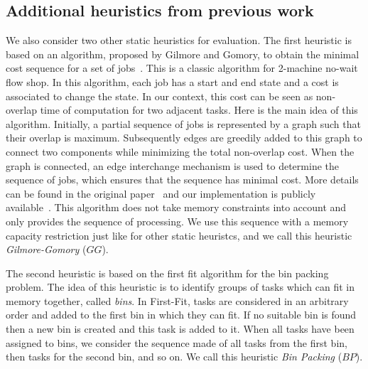 \documentclass[sigconf]{acmart}
\begin{document}
{		\subsection{Additional heuristics from previous work}
		
		
		We also consider two other static heuristics for evaluation. The first heuristic is based on an algorithm, proposed by Gilmore and Gomory, to obtain the minimal cost sequence for a set of jobs~\cite{Gilmore-Gomory:1964}. This is a classic algorithm for 2-machine no-wait flow shop. In this algorithm, each job has a start and end state and a cost is associated to change the state. In our context, this cost can be seen as non-overlap time of computation for two adjacent tasks. Here is the main idea of this algorithm. Initially, a partial sequence of jobs is represented by a graph such that their overlap is maximum. Subsequently edges are greedily added to this graph to connect two components while minimizing the total non-overlap cost. When the graph is  connected, an edge interchange mechanism is used to determine the sequence of jobs, which ensures that the sequence has minimal cost. More details can be found in the original paper~\cite{Gilmore-Gomory:1964} and our implementation is publicly available~\cite{gitworkrepo}. This algorithm does not take memory constraints into account and only provides the sequence of processing. We use this sequence with a memory capacity restriction just like for other static heuristcs, and we call this heuristic \textit{Gilmore-Gomory} ($GG$).
		
		The second heuristic is based on the first fit algorithm for the bin packing problem. The idea of this heuristic is to identify groups of tasks which can fit in memory together, called \emph{bins}. In First-Fit, tasks are considered in an arbitrary order and added to the first bin in which they can fit. If no suitable bin is found then a new bin is created and this task is added to it. When all tasks have been assigned to bins, we consider the sequence made of all tasks from the first bin, then tasks for the second bin, and so on. We call this heuristic \textit{Bin Packing} ($BP$). 
		
		
}
\end{document}
